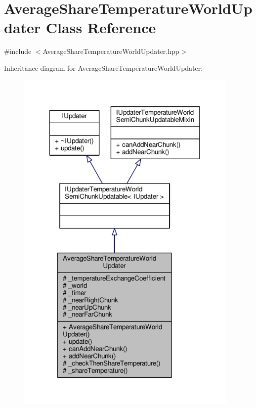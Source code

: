 \hypertarget{class_average_share_temperature_world_updater}{\section{Average\-Share\-Temperature\-World\-Updater Class Reference}
\label{class_average_share_temperature_world_updater}
}


{\ttfamily \#include $<$Average\-Share\-Temperature\-World\-Updater.\-hpp$>$}



Inheritance diagram for Average\-Share\-Temperature\-World\-Updater\-:
\nopagebreak
\begin{figure}[H]
\begin{center}
\leavevmode
\includegraphics[width=307pt]{class_average_share_temperature_world_updater__inherit__graph}
\end{center}
\end{figure}


